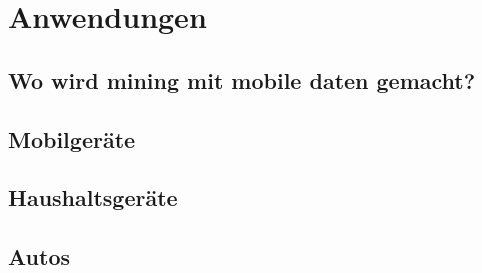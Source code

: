 \section{Anwendungen}

\subsection{Wo wird mining mit mobile daten gemacht?}

\subsection{Mobilgeräte}

\subsection{Haushaltsgeräte}

\subsection{Autos}
